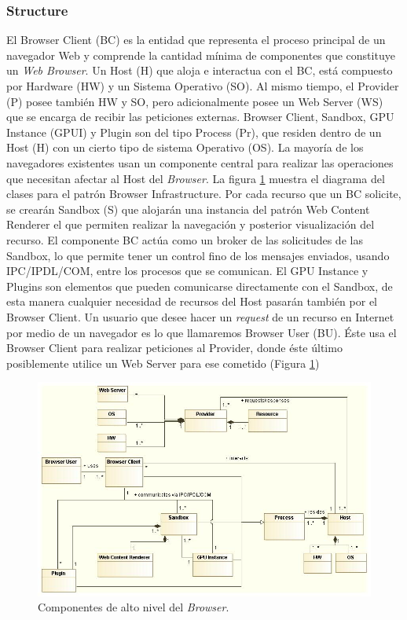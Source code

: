 \documentclass{sig-alternate-05-2015}
\begin{document}
    \subsubsection*{Structure}
    El Browser Client (BC) es la entidad que representa el proceso principal de un navegador Web y comprende la cantidad mínima de componentes que constituye un \textit{Web Browser}. Un Host (H) que aloja e interactua con el BC, está compuesto por Hardware (HW) y un Sistema Operativo (SO). Al mismo tiempo, el Provider (P) posee también HW y SO, pero adicionalmente posee un Web Server (WS) que se encarga de recibir las peticiones externas. Browser Client, Sandbox, GPU Instance (GPUI) y Plugin son del tipo Process (Pr), que residen dentro de un Host (H) con un cierto tipo de sistema Operativo (OS). La mayoría de los navegadores existentes usan un componente central para realizar las operaciones que necesitan afectar al Host del \textit{Browser}. La figura \ref{fig:BIPatt} muestra el diagrama del clases para el patrón Browser Infrastructure. Por cada recurso que un BC solicite, se crearán Sandbox (S) que alojarán una instancia del patrón Web Content Renderer el que permiten realizar la navegación y posterior visualización del recurso.
    El componente BC actúa como un broker de las solicitudes de las Sandbox, lo que permite tener un control fino de los mensajes enviados, usando IPC/IPDL/COM, entre los procesos que se comunican. El GPU Instance y Plugins son elementos que pueden comunicarse directamente con el Sandbox, de esta manera cualquier necesidad de recursos del Host pasarán también por el Browser Client. 
    Un usuario que desee hacer un \textit{request} de un recurso en Internet por medio de un navegador es lo que llamaremos Browser User (BU). Éste usa el Browser Client para realizar peticiones al Provider, donde éste último posiblemente utilice un Web Server para ese cometido (Figura \ref{fig:BIPatt})
    \begin{figure}[h!t]
      \centering
      \includegraphics[scale=0.55]{figures/browserInfraPattern_v3.jpg}
      \caption{Componentes de alto nivel del \textit{Browser}.}
      \label{fig:BIPatt}
    \end{figure}
\end{document}
